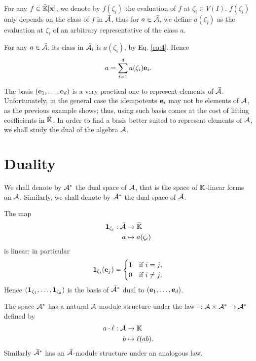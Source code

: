 For any $f\in\bar{\mathbb{K}}[\mathbf{x}]$, we denote by $f(\zeta_i)$ the
evaluation of $f$ at $\zeta_i\in V(I)$. $f(\zeta_i)$ only depends on
the class of $f$ in $\mathcal{\bar{A}}$, thus for
$a\in\bar{\mathcal{A}}$, we define $a(\zeta_i)$ as the evaluation at
$\zeta_i$ of an arbitrary representative of the class $a$.

For any $a\in\bar{\mathcal{A}}$, its class in $\bar{\mathcal{A}}_i$ is $a(\zeta_i)$,
by Eq. \eqref{eq:4}. Hence
\begin{equation}
  \label{eq:2}
  a = \sum_{i=1}^da(\zeta_i)\mathbf{e}_i
  \text{.}
\end{equation}

The basis $(\mathbf{e}_1,\ldots,\mathbf{e}_d)$ is a very practical one
to represent elements of $\bar{\mathcal{A}}$. Unfortunately, in the
general case the idempotents $\mathbf{e}_i$ may not be elements of
$\mathcal{A}$, as the previous example shows; thus, using such basis
comes at the cost of lifting coefficients in $\bar{\mathbb{K}}$. In order to
find a basis better suited to represent elements of $\mathcal{A}$, we
shall study the dual of the algebra $\bar{\mathcal{A}}$.


\section{Duality}
\label{sec:dual}
We shall denote by $\mathcal{A}^\ast$ the dual space of $\mathcal{A}$,
that is the space of $\mathbb{K}$-linear forms on $\mathcal{A}$. Similarly, we
shall denote by $\bar{\mathcal{A}}^\ast$ the dual space of
$\bar{\mathcal{A}}$.

The map
\begin{equation}
  \label{eq:8}
  \begin{aligned}
  \mathbf{1}_{\zeta_i} : \bar{\mathcal{A}} &\rightarrow \bar{\mathbb{K}}\\
  a &\mapsto a(\zeta_i)
  \end{aligned}
\end{equation}
is linear; in particular
\begin{equation}
  \label{eq:9}
  \mathbf{1}_{\zeta_i}(\mathbf{e}_j) =
  \begin{cases}
    1 &\text{if $i=j$,}\\
    0 &\text{if $i\ne j$.}
  \end{cases}
\end{equation}
Hence $(\mathbf{1}_{\zeta_1},\ldots,\mathbf{1}_{\zeta_d})$ is the basis
of $\bar{\mathcal{A}}^\ast$ dual to $(\mathbf{e}_1,\ldots,\mathbf{e}_d)$.

The space $\mathcal{A}^\ast$ has a natural $\mathcal{A}$-module
structure under the law
$\cdot:\mathcal{A}\times\mathcal{A}^\ast\rightarrow\mathcal{A}^\ast$ defined by
\begin{equation}
  \label{eq:10}
  \begin{aligned}
    a\cdot\ell : \mathcal{A} &\rightarrow \mathbb{K}\\
    b &\mapsto \ell(ab)
    \text{.}
  \end{aligned}
\end{equation}
Similarly $\bar{\mathcal{A}}^\ast$ has an $\bar{\mathcal{A}}$-module
structure under an analogous law.

